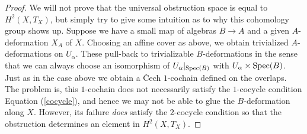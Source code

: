 \documentclass[11pt]{amsart}
\def\Spec{{\rm Spec}}
\begin{document}
\begin{proof}
We will not prove that the universal obstruction space is equal to $H^2(X,T_X)$, but simply try to give some intuition as to why this cohomology group shows up. 
Suppose we have a small map of algebras $B \to A$ and a given $A$-deformation $X_A$ of $X$. 
Choosing an affine cover as above, we obtain trivialized $A$-deformations on $U_{\alpha}$. 
These pull-back to trivializable $B$-deformations in the sense that we can always choose an isomorphism of $U_{\alpha}|_{\Spec(B)}$ with $U_\alpha \times \Spec(B)$. 
Just as in the case above we obtain a \v{C}ech $1$-cochain defined on the overlaps. 
The problem is, this $1$-cochain does not necessarily satisfy the $1$-cocycle condition Equation (\ref{cocycle}), and hence we may not be able to glue the $B$-deformation along $X$. 
However, its failure {\em does} satisfy the $2$-cocycle condition so that the obstruction determines an element in $H^2(X, T_X)$. 
\end{proof}


%  

\end{document}
